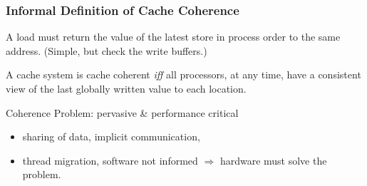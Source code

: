 \documentclass{beamer}
\begin{document}
\begin{frame}[fragile,t]
\frametitle{Informal Definition of Cache Coherence}

\pause
\begin{definition}
A load must return the value of the latest store 
in process order to the same address. (Simple, but check the write buffers.)
\end{definition}

\begin{definition}
A cache system is cache coherent {\em iff} all processors, 
at any time, have a consistent view of the last 
globally written value to each location.
\end{definition}

\medskip

\alert{Coherence Problem: pervasive \& performance critical}
\begin{scriptsize}
\begin{itemize}
    \item sharing of data, implicit communication, 
    \item thread migration, software not informed $\Rightarrow$ hardware must solve the problem.
\end  {itemize}
\end {scriptsize}

\end{frame}
\end{document}
